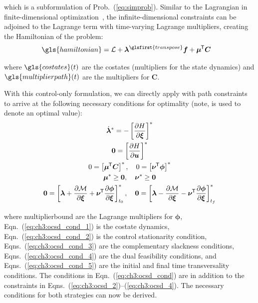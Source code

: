 \noindent which is a subformulation of Prob.~(\ref{eq:simprob}).
Similar to the Lagrangian in finite-dimensional optimization~\cite{Papalambros2017a, Liberzon2012a}, the infinite-dimensional constraints can be adjoined to the Lagrange term with time-varying Lagrange multipliers, creating the Hamiltonian of the problem:
\begin{align}
\gls{hamiltonian} &= \lagrange + \blambda^{\glsfirst{transpose}} \bfd + \bmu\tran \bm{C}
\end{align}

\noindent where $\gls{costates}(t)$ are the costates (multipliers for the state dynamics) and $\gls{multiplierpath}(t)$ are the multipliers for $\bm{C}$.

With this control-only formulation, we can directly apply  with path constraints~\cite{Pontryagin1962a, Liberzon2012a, Chachuat2007a} to arrive at the following necessary conditions for optimality (note,  is used to denote an optimal value):
\begin{subequations}
\label{eq:ch3:ocsd_cond}
\begin{gather}
\dot{\bm{\lambda}}^* = - \left[ \frac{\partial H}{\partial \bm{\xi}} \right]^* \label{eq:ch3:ocsd_cond_1} \\
\bm{0} = \left[ \frac{\partial H}{\partial \bm{u}} \right]^* \label{eq:ch3:ocsd_cond_2} \\
0 = \left[ \bm{\mu}^{\mkern-1.5mu\mathsf{T}} \bm{C}\right]^*, \quad 0 = \left[ \bm{\nu}^{\mkern-1.5mu\mathsf{T}} \bm{\phi} \right]^* \label{eq:ch3:ocsd_cond_3} \\
\bm{\mu}^* \geq \bm{0}, \quad \bm{\nu}^* \geq \bm{0} \label{eq:ch3:ocsd_cond_4} \\
\bm{0} = \left[ \bm{\lambda} + \frac{\partial \mathcal{M}}{\partial \bm{\xi}} + \bm{\nu}^{\mkern-1.5mu\mathsf{T}} \frac{\partial \bm{\phi}}{\partial \bm{\xi}} \right]_{t_0}^* \label{eq:ch3:ocsd_cond_5}, \quad 
\bm{0} = \left[ \bm{\lambda} - \frac{\partial \mathcal{M}}{\partial \bm{\xi}} - \bm{\nu}^{\mkern-1.5mu\mathsf{T}} \frac{\partial \bm{\phi}}{\partial \bm{\xi}} \right]_{t_f}^*
\end{gather}
\end{subequations}

\noindent where \gls{multiplierbound} are the Lagrange multipliers for $\bm{\phi}$,
Eqn.~(\ref{eq:ch3:ocsd_cond_1}) is the {costate dynamics},
Eqn.~(\ref{eq:ch3:ocsd_cond_2}) is the {control stationarity condition},
Eqns.~(\ref{eq:ch3:ocsd_cond_3}) are the {complementary slackness conditions},
Eqns.~(\ref{eq:ch3:ocsd_cond_4}) are the {dual feasibility conditions}, and
Eqns.~(\ref{eq:ch3:ocsd_cond_5}) are the {initial and final time transversality conditions}.
The conditions in Eqn.~(\ref{eq:ch3:ocsd_cond}) are in addition to the constraints in Eqns.~(\ref{eq:ch3:ocsd_2})--(\ref{eq:ch3:ocsd_4}). The necessary conditions for both strategies can now be derived.


